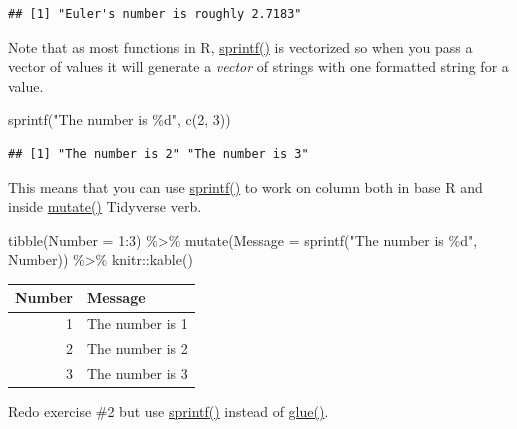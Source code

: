 \documentclass[
]{book}
\newenvironment{Shaded}{\begin{snugshade}}{\end{snugshade}}
\newcommand{\AttributeTok}[1]{\textcolor[rgb]{0.77,0.63,0.00}{#1}}
\newcommand{\DecValTok}[1]{\textcolor[rgb]{0.00,0.00,0.81}{#1}}
\newcommand{\FunctionTok}[1]{\textcolor[rgb]{0.00,0.00,0.00}{#1}}
\newcommand{\NormalTok}[1]{#1}
\newcommand{\SpecialCharTok}[1]{\textcolor[rgb]{0.00,0.00,0.00}{#1}}
\newcommand{\StringTok}[1]{\textcolor[rgb]{0.31,0.60,0.02}{#1}}
\begin{document}
\begin{verbatim}
## [1] "Euler's number is roughly 2.7183"
\end{verbatim}

Note that as most functions in R, \href{https://stat.ethz.ch/R-manual/R-patched/library/base/html/sprintf.html}{sprintf()} is vectorized so when you pass a vector of values it will generate a \emph{vector} of strings with one formatted string for a value.

\begin{Shaded}
\begin{Highlighting}[]
\FunctionTok{sprintf}\NormalTok{(}\StringTok{"The number is \%d"}\NormalTok{, }\FunctionTok{c}\NormalTok{(}\DecValTok{2}\NormalTok{, }\DecValTok{3}\NormalTok{))}
\end{Highlighting}
\end{Shaded}

\begin{verbatim}
## [1] "The number is 2" "The number is 3"
\end{verbatim}

This means that you can use \href{https://stat.ethz.ch/R-manual/R-patched/library/base/html/sprintf.html}{sprintf()} to work on column both in base R and inside \href{https://dplyr.tidyverse.org/reference/mutate.html}{mutate()} Tidyverse verb.

\begin{Shaded}
\begin{Highlighting}[]
\FunctionTok{tibble}\NormalTok{(}\AttributeTok{Number =} \DecValTok{1}\SpecialCharTok{:}\DecValTok{3}\NormalTok{) }\SpecialCharTok{\%\textgreater{}\%}
  \FunctionTok{mutate}\NormalTok{(}\AttributeTok{Message =} \FunctionTok{sprintf}\NormalTok{(}\StringTok{"The number is \%d"}\NormalTok{, Number)) }\SpecialCharTok{\%\textgreater{}\%}
\NormalTok{  knitr}\SpecialCharTok{::}\FunctionTok{kable}\NormalTok{()}
\end{Highlighting}
\end{Shaded}

\begin{tabular}{r|l}
\hline
Number & Message\\
\hline
1 & The number is 1\\
\hline
2 & The number is 2\\
\hline
3 & The number is 3\\
\hline
\end{tabular}

Redo exercise \#2 but use \href{https://stat.ethz.ch/R-manual/R-patched/library/base/html/sprintf.html}{sprintf()} instead of \href{https://glue.tidyverse.org/reference/glue.html}{glue()}.
\end{document}

